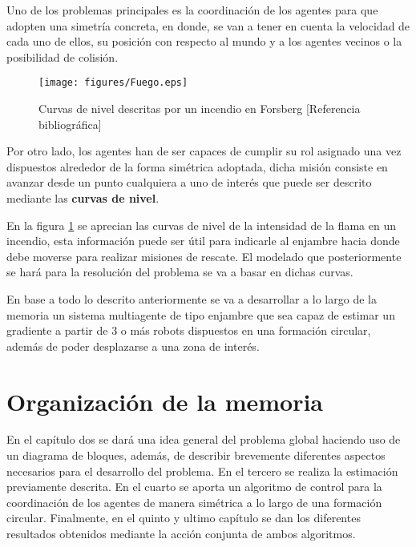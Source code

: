 Uno de los problemas principales es la coordinación de los agentes para que adopten una simetría concreta, en donde, se van a tener en cuenta la velocidad de cada uno de ellos, su posición con respecto al mundo y a los agentes vecinos o la posibilidad de colisión.\\



\begin{figure}[htb]
\centering
\texttt{[image: figures/Fuego.eps]}
\caption{Curvas de nivel descritas por un incendio en Forsberg [Referencia bibliográfica]} \label{fig:countour_levels}
\end{figure}

\newpage

Por otro lado, los agentes han de ser capaces de cumplir su rol asignado una vez dispuestos alrededor de la forma simétrica adoptada, dicha misión consiste en avanzar desde un punto cualquiera a uno de interés que puede ser descrito mediante las \textbf{curvas de nivel}.

En la figura \ref{fig:countour_levels} se aprecian las curvas de nivel de la intensidad de la flama en un incendio, esta información puede ser útil para indicarle al enjambre hacia donde debe moverse para realizar misiones de rescate. El modelado que posteriormente se hará para la resolución del problema se va a basar en dichas curvas. 

En base a todo lo descrito anteriormente se va a desarrollar a lo largo de la memoria un sistema multiagente de tipo enjambre que sea capaz de estimar un gradiente a partir de 3 o más robots dispuestos en una formación circular, además de poder desplazarse a una zona de interés.

\section{Organización de la memoria}

En el capítulo dos se dará una idea general del problema global haciendo uso de un diagrama de bloques, además, de describir brevemente diferentes aspectos necesarios para el desarrollo del problema. En el tercero se realiza la estimación previamente descrita. En el cuarto se aporta un algoritmo de control para la coordinación de los agentes de manera simétrica a lo largo de una formación circular. Finalmente, en el quinto y ultimo capítulo se dan los diferentes resultados obtenidos mediante la acción conjunta de ambos algoritmos.